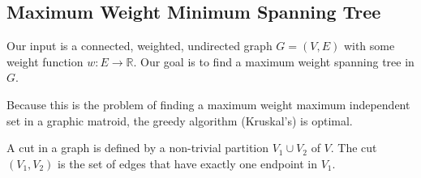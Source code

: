 \subsection{Maximum Weight Minimum Spanning Tree}

Our input is a connected, weighted, undirected graph $G = (V, E)$
with some weight function $w : E \to \mathbb{R}$. Our goal is to 
find a maximum weight spanning tree in $G$.

Because this is the problem of finding a maximum weight maximum
independent set in a graphic matroid, the greedy algorithm (Kruskal's)
is optimal.

\begin{definition}
    A cut in a graph is defined by a non-trivial partition
    $V_1 \cup V_2$ of $V$. The cut $(V_1, V_2)$ is the set of edges
    that have exactly one endpoint in $V_1$.
\end{definition}












